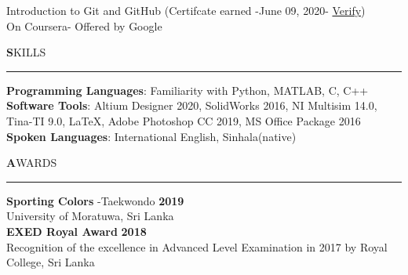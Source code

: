 \documentclass[legalpaper,11pt]{article}
\begin{document}
Introduction to Git and GitHub  \hfill (Certifcate earned -June 09, 2020- \href{https://coursera.org/share/11e7ef2a9ae7b3358177c9bb7ad81574}{Verify})\\
\hspace{5mm}On Coursera- Offered by Google


\setlength{\leftskip}{0pt}
\vspace{1.5cm}



\textbf{\Large S}KILLS

\vspace{2mm}\hrule\vspace{5mm}
\setlength{\leftskip}{5mm}

\textbf{\large Programming Languages}: Familiarity with Python, MATLAB, C, C++ \\

\textbf{\large Software Tools}: Altium Designer 2020, SolidWorks 2016, NI Multisim 14.0, Tina-TI 9.0, \LaTeX , Adobe Photoshop CC 2019, MS Office Package 2016\\

\textbf{\large Spoken Languages}: International English, Sinhala(native)

\setlength{\leftskip}{0pt}
\vspace{1.5cm}




\textbf{\Large A}WARDS

\vspace{2mm}\hrule\vspace{5mm}
\setlength{\leftskip}{5mm}


\textbf{Sporting Colors} -Taekwondo \hfill\textbf{2019}\\
University of Moratuwa, Sri Lanka\\

\textbf{EXED Royal Award} \hfill\textbf{2018}\\
Recognition of the excellence in Advanced Level Examination in 2017 by Royal College, Sri Lanka\\
\end{document}
